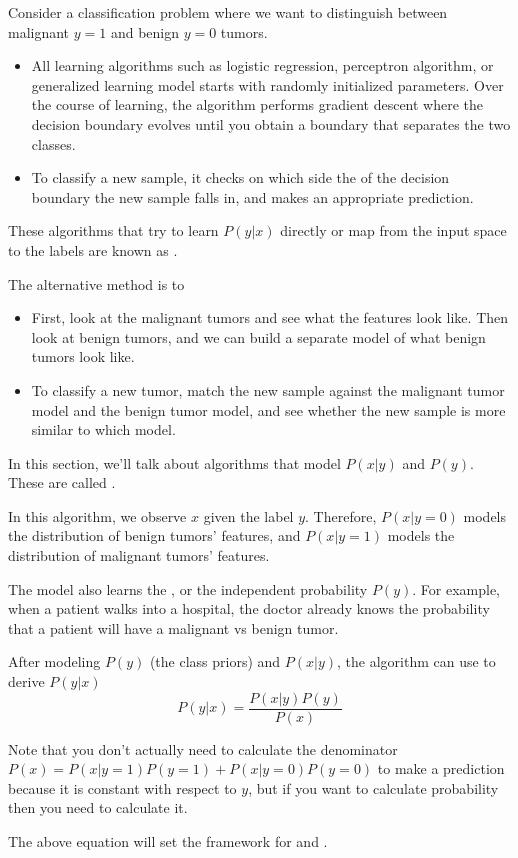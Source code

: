 \documentclass[12pt]{scrartcl}
\begin{document}
Consider a classification problem where we want to distinguish between malignant $y=1$ and benign $y=0$ tumors.
\begin{itemize}
    \item All learning algorithms such as logistic regression, perceptron algorithm, or generalized learning model starts with randomly initialized parameters. Over the course of learning, the algorithm performs gradient descent where the decision boundary evolves until you obtain a boundary that separates the two classes.
    \item To classify a new sample, it checks on which side the of the decision boundary the new sample falls in, and makes an appropriate prediction.
\end{itemize}
\begin{definition}
    These algorithms that try to learn $P(y | x)$ directly or map from the input space to the labels are known as .
\end{definition}
The alternative method is to 
\begin{itemize}
    \item First, look at the malignant tumors and see what the features look like. Then look at benign tumors, and we can build a separate model of what benign tumors look like.
    \item To classify a new tumor, match the new sample against the malignant tumor model and the benign tumor model, and see whether the new sample is more similar to which model. 
\end{itemize}
\begin{definition}
    In this section, we'll talk about algorithms that model $P(x | y)$ and $P(y)$. These are called .
\end{definition}
\begin{note}
    In this algorithm, we observe $x$ given the label $y$. Therefore, $P(x | y=0)$ models the distribution of benign tumors' features, and $P(x | y = 1)$ models the distribution of malignant tumors' features.
\end{note}
\begin{definition}
    The model also learns the , or the independent probability $P(y)$. For example, when a patient walks into a hospital, the doctor already knows the probability that a patient will have a malignant vs benign tumor.
\end{definition}

After modeling $P(y)$ (the class priors) and $P(x | y)$, the algorithm can use 
to derive $P(y | x)$
\[P(y | x) = \frac{P(x | y)P(y)}{P(x)}\]
\begin{note}
    Note that you don't actually need to calculate the denominator $P(x) = P(x | y = 1)P(y = 1) + P(x | y = 0)P(y = 0)$ to make a prediction because it is constant with respect to $y$, but if you want to calculate probability then you need to calculate it.
\end{note}
The above equation will set the framework for  and .
\end{document}
